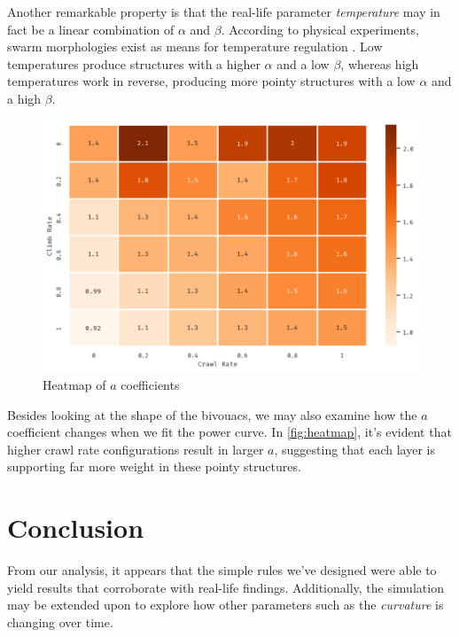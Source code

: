 \documentclass[a4paper,10pt]{article}
\begin{document}
\begin{multicols}{2}
    Another remarkable property is that the real-life parameter \textit{temperature}
    may in fact be a linear combination of $\alpha$ and $\beta$. According to physical experiments,
    swarm morphologies exist as means for temperature regulation \cite{heinrich1981mechanisms}.
    Low temperatures produce structures with a higher $\alpha$ and a low $\beta$, whereas
    high temperatures work in reverse, producing more pointy structures with a low $\alpha$
    and a high $\beta$.

    \begin{figure}[H]
        \centering
        \includegraphics[width=\linewidth]{heatmap.pdf}
        \caption{Heatmap of $a$ coefficients}
        \label{fig:heatmap}
    \end{figure}

    Besides looking at the shape of the bivouacs, we may also examine how the $a$
    coefficient changes when we fit the power curve. In \autoref{fig:heatmap}, it's evident
    that higher crawl rate configurations result in larger $a$, suggesting that each layer
    is supporting far more weight in these pointy structures.

    \section{Conclusion}

    From our analysis, it appears that the simple rules we've designed were able to yield
    results that corroborate with real-life findings. Additionally, the simulation may be
    extended upon to explore how other parameters such as the \textit{curvature} is
    changing over time.


\end{multicols}
\end{document}
